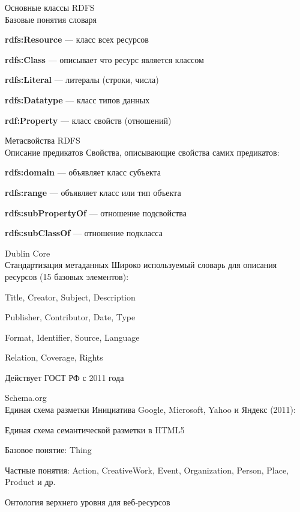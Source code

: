 \begin{frame}{Основные классы RDFS\\Базовые понятия словаря}
	\topline
	\justifying
	\begin{textitemize}
		\item \textbf{rdfs:Resource} --- класс всех ресурсов
		\item \textbf{rdfs:Class} --- описывает что ресурс является классом
		\item \textbf{rdfs:Literal} --- литералы (строки, числа)
		\item \textbf{rdfs:Datatype} --- класс типов данных
		\item \textbf{rdf:Property} --- класс свойств (отношений)
	\end{textitemize}
\end{frame}

\begin{frame}{Метасвойства RDFS\\Описание предикатов}
	\topline
	\justifying
	Свойства, описывающие свойства самих предикатов:
	
	\begin{textitemize}
		\item \textbf{rdfs:domain} --- объявляет класс субъекта
		\item \textbf{rdfs:range} --- объявляет класс или тип объекта
		\item \textbf{rdfs:subPropertyOf} --- отношение подсвойства
		\item \textbf{rdfs:subClassOf} --- отношение подкласса
	\end{textitemize}
\end{frame}

\begin{frame}{Dublin Core\\Стандартизация метаданных}
	\topline
	\justifying
	Широко используемый словарь для описания ресурсов (15 базовых элементов):
	\begin{textitemize}
		\item Title, Creator, Subject, Description
		\item Publisher, Contributor, Date, Type
		\item Format, Identifier, Source, Language
		\item Relation, Coverage, Rights
	\end{textitemize}
	
	Действует ГОСТ РФ с 2011 года
\end{frame}

\begin{frame}{Schema.org\\Единая схема разметки}
	\topline
	\justifying
	Инициатива Google, Microsoft, Yahoo и Яндекс (2011):
	\begin{textitemize}
		\item Единая схема семантической разметки в HTML5
		\item Базовое понятие: Thing
		\item Частные понятия: Action, CreativeWork, Event, Organization, Person, Place, Product и др.
		\item Онтология верхнего уровня для веб-ресурсов
	\end{textitemize}
\end{frame}

